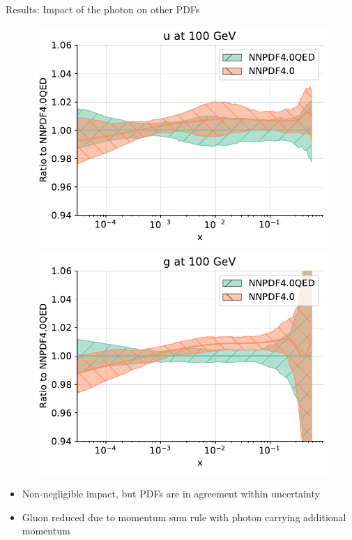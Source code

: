 \documentclass[aspectratio=169, 9pt,t]{beamer}
\begin{document}
\begin{frame}{Results: Impact of the photon on other PDFs}

  \begin{figure}[!t]
    \centering
    \includegraphics[width=.49\textwidth]{figures/plot_pdfs_u_qed.pdf}
    \includegraphics[width=.49\textwidth]{figures/plot_pdfs_g_qed.pdf}\\
  \end{figure}

  \begin{itemize}
    \item Non-negligible impact, but PDFs are in agreement within uncertainty
    \item Gluon reduced due to momentum sum rule with photon carrying additional momentum
  \end{itemize}
\end{frame}


\end{document}
